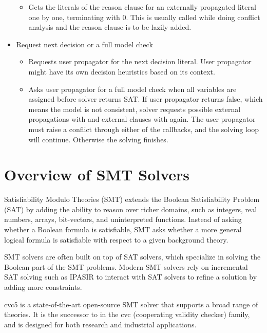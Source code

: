 \begin{itemize}
\begin{itemize}
      \item {} Gets the literals of the reason clause for an externally propagated literal one by one, terminating with 0. This is usually called while doing conflict analysis and the reason clause is to be lazily added.
    \end{itemize}
  \item Request next decision or a full model check
    \begin{itemize}
      \item {} Requests user propagator for the next decision literal. User propagator might have its own decision heuristics based on its context.
      \item {} Asks user propagator for a full model check when all variables are assigned before solver returns SAT. If user propagator returns false, which means the model is not consistent, solver requests possible external propagations with  and external clauses with  again. The user propagator must raise a conflict through either of the callbacks, and the solving loop will continue. Otherwise the solving finishes.
    \end{itemize}
\end{itemize}


\section{Overview of SMT Solvers}

Satisfiability Modulo Theories (SMT) extends the Boolean Satisfiability Problem (SAT) by adding the ability to reason over richer domains, such as integers, real numbers, arrays, bit-vectors, and uninterpreted functions. Instead of asking whether a Boolean formula is satisfiable, SMT asks whether a more general logical formula is satisfiable with respect to a given background theory.

SMT solvers are often built on top of SAT solvers, which specialize in solving the Boolean part of the SMT problems. Modern SMT solvers rely on incremental SAT solving such as IPASIR to interact with SAT solvers to refine a solution by adding more constraints.

cvc5 is a state-of-the-art open-source SMT solver that supports a broad range of theories. \cite{10.1007/978-3-030-99524-9_24} It is the successor to  in the cvc (cooperating validity checker) family, and is designed for both research and industrial applications.

